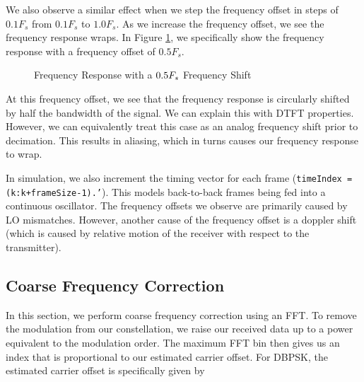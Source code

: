 \documentclass{article}
\begin{document}
\noindent We also observe a similar effect when we step the frequency offset in steps of $0.1F_s$ from $0.1F_s$ to $1.0F_s$. As we increase the frequency offset, we see the frequency response wraps. In Figure \ref{fig::psd_freq_offset_05}, we specifically show the frequency response with a frequency offset of $0.5F_s$. 

\begin{figure}[H]
	\centerline{}
	\caption{Frequency Response with a $\protect{0.5F_s}$ Frequency Shift}
	\label{fig::psd_freq_offset_05}
\end{figure}

\noindent At this frequency offset, we see that the frequency response is circularly shifted by half the bandwidth of the signal. We can explain this with DTFT properties. However, we can equivalently treat this case as an analog frequency shift prior to decimation. This results in aliasing, which in turns causes our frequency response to wrap.

	In simulation, we also increment the timing vector for each frame (\texttt{timeIndex = (k:k+frameSize-1).'}). This models back-to-back frames being fed into a continuous oscillator. The frequency offsets we observe are primarily caused by LO mismatches. However, another cause of the frequency offset is a doppler shift (which is caused by relative motion of the receiver with respect to the transmitter).

\subsection{Coarse Frequency Correction}

In this section, we perform coarse frequency correction using an FFT. To remove the modulation from our constellation, we raise our received data up to a power equivalent to the modulation order. The maximum FFT bin then gives us an index that is proportional to our estimated carrier offset. For DBPSK, the estimated carrier offset is specifically given by
\end{document}
